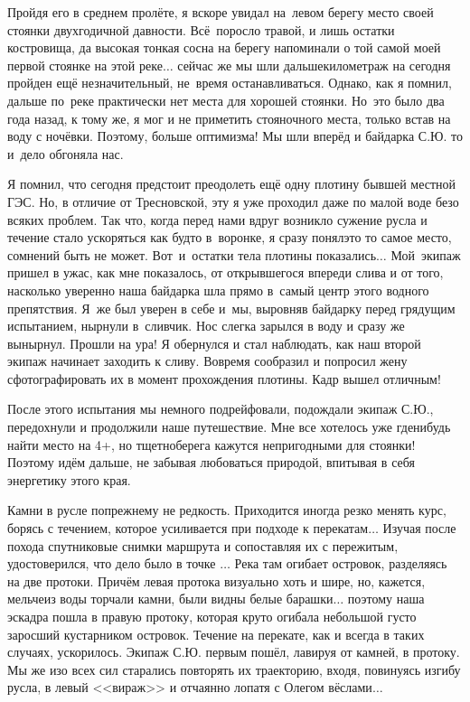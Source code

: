 Пройдя его в среднем пролёте, я вскоре увидал на~левом берегу место своей стоянки двухгодичной давности. Всё~поросло травой, и лишь остатки костровища, да высокая тонкая сосна на берегу напоминали о той самой моей первой стоянке на этой реке$\ldots$ сейчас же мы шли дальше\mdash километраж на сегодня пройден ещё незначительный, не~время останавливаться. Однако, как я помнил, дальше по~реке практически нет места для хорошей стоянки. Но~это было два года назад, к тому же, я мог и не приметить стояночного места, только встав на воду с ночёвки. Поэтому, больше оптимизма! Мы шли вперёд и байдарка С.Ю. то и~дело обгоняла нас. 

Я помнил, что сегодня предстоит преодолеть ещё одну плотину бывшей местной ГЭС. Но, в отличие от Тресновской, эту я уже проходил даже по малой воде безо всяких проблем. Так что, когда перед нами вдруг возникло сужение русла и течение стало ускоряться как будто в~воронке, я сразу понял\mdash это то самое место, сомнений быть не может. Вот~и~остатки тела плотины показались$\ldots$ Мой~экипаж пришел в ужас, как мне показалось, от открывшегося впереди слива и от того, насколько уверенно наша байдарка шла прямо в~самый центр этого водного препятствия. Я~же был уверен в себе и~мы, выровняв байдарку перед грядущим испытанием, нырнули в~сливчик. Нос слегка зарылся в воду и сразу же вынырнул. Прошли на ура! Я обернулся и стал наблюдать, как наш второй экипаж начинает заходить к сливу. Вовремя сообразил и попросил жену сфотографировать их в момент прохождения плотины. Кадр вышел отличным!

После этого испытания мы немного подрейфовали, подождали экипаж С.Ю., передохнули и продолжили наше путешествие. Мне все хотелось уже где\sdash нибудь найти место на 4+, но тщетно\mdash берега кажутся непригодными для стоянки! Поэтому идём дальше, не забывая любоваться природой, впитывая в себя энергетику этого края.

Камни в русле по\sdash прежнему не редкость. Приходится иногда резко менять курс, борясь с течением, которое усиливается при подходе к перекатам$\ldots$ Изучая после похода спутниковые снимки маршрута и сопоставляя их с пережитым, удостоверился, что дело было в точке \CoordsLidRightProtoka$\ldots$ Река там огибает островок, разделяясь на две протоки. Причём левая протока визуально хоть и шире, но, кажется, мельче\mdash из воды торчали камни, были видны белые барашки$\ldots$ поэтому наша эскадра пошла в правую протоку, которая круто огибала небольшой густо заросший кустарником островок. Течение на перекате, как и всегда в таких случаях, ускорилось. Экипаж С.Ю. первым пошёл, лавируя от камней, в протоку. Мы же изо всех сил старались повторять их траекторию, входя, повинуясь изгибу русла, в левый <<вираж>> и отчаянно лопатя с Олегом вёслами$\ldots$ 

